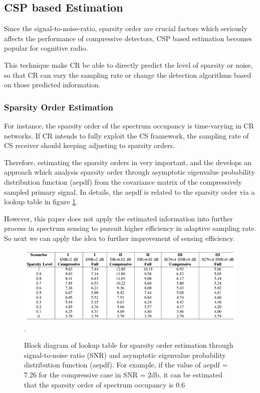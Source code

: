 \subsection{CSP based Estimation}\label{sct:csp_estim}

Since the signal-to-noise-ratio, sparsity order are crucial factors which seriously affects the performance of compressive detectors, CSP based estimation becomes popular for cognitive radio. 

This technique make CR be able to directly predict the level of sparsity or noise, so that CR can vary the sampling rate or change the detection algorithms based on those predicted information.

\subsubsection{Sparsity Order Estimation}

For instance, the sparsity order of the spectrum occupancy is time-varying in CR networks. If CR intends to fully exploit the CS framework, the sampling rate of CS receiver should keeping adjusting to sparsity orders. 

Therefore, estimating the sparsity orders in very important, and the \cite{sharma2014compressive} develops an approach which analysis sparsity order through asymptotic eigenvalue probability distribution function (aepdf) from the covariance matrix of the compressively sampled primary signal. In details, the aepdf is related to the sparsity order via a lookup table in figure \ref{csp-soe}. 

However, this paper does not apply the estimated information into further process in spectrum sensing to pursuit higher efficiency in adaptive sampling rate. So next we can apply the idea to further improvement of sensing efficiency.

\begin{figure}[!t]
\centering
\includegraphics[width=0.75\columnwidth]{figs/csp-soe.png}
\DeclareGraphicsExtensions.
\caption{Block diagram of lookup table for sparsity order estimation through signal-to-noise ratio (SNR) and asymptotic eigenvalue probability distribution function (aepdf). For example, if the value of aepdf = 7.26 for the compressive case in SNR = 2db, it can be estimated that the sparsity order of spectrum occupancy is 0.6}\label{csp-soe}
\end{figure}

